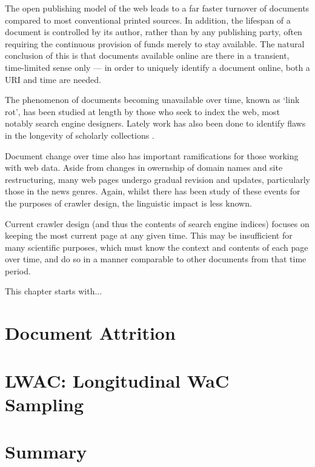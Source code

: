 
\label{sec:longitudinal:introduction}
The open publishing model of the web leads to a far faster turnover of documents compared to most conventional printed sources.  In addition, the lifespan of a document is controlled by its author, rather than by any publishing party, often requiring the continuous provision of funds merely to stay available.  The natural conclusion of this is that documents available online are there in a transient, time-limited sense only --- in order to uniquely identify a document online, both a URI and time are needed.

The phenomenon of documents becoming unavailable over time, known as `link rot', has been studied at length by those who seek to index the web, most notably search engine designers.  Lately work has also been done to identify flaws in the longevity of scholarly collections .

Document change over time also has important ramifications for those working with web data.  Aside from changes in owernship of domain names and site restructuring, many web pages undergo gradual revision and updates, particularly those in the news genres.  Again, whilst there has been study of these events for the purposes of crawler design, the linguistic impact is less known.

Current crawler design (and thus the contents of search engine indices) focuses on keeping the most current page at any given time.  This may be insufficient for many scientific purposes, which must know the context and contents of each page over time, and do so in a manner comparable to other documents from that time period.

This chapter starts with...


\section{Document Attrition}
\label{sec:longitudinal:attrition}




\section{LWAC: Longitudinal WaC Sampling}
\label{sec:longitudinal:lwac}





\section{Summary}
\label{sec:longitudinal:summary}



